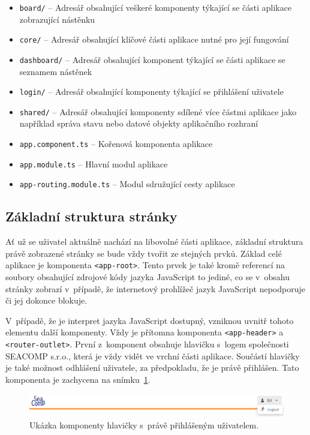 \begin{itemize}
  \item \texttt{board/} -- Adresář obsahující veškeré komponenty týkající se části aplikace zobrazující nástěnku
  \item \texttt{core/} -- Adresář obsahující klíčové části aplikace nutné pro její fungování
  \item \texttt{dashboard/} -- Adresář obsahující komponent týkající se části aplikace se seznamem nástěnek
  \item \texttt{login/} -- Adresář obsahující komponenty týkající se přihlášení uživatele
  \item \texttt{shared/} -- Adresář obsahující komponenty sdílené více částmi aplikace jako například správa stavu nebo datové objekty aplikačního rozhraní
  \item \texttt{app.component.ts} -- Kořenová komponenta aplikace
  \item \texttt{app.module.ts} -- Hlavní modul aplikace
  \item \texttt{app-routing.module.ts} -- Modul sdružující cesty aplikace
\end{itemize}


\subsection{Základní struktura stránky}
Ať už se uživatel aktuálně nachází na libovolné části aplikace, základní struktura právě zobrazené stránky se bude vždy tvořit ze stejných prvků. Základ celé aplikace je komponenta \texttt{<app-root>}. Tento prvek je také kromě referencí na soubory obsahující zdrojové kódy jazyka JavaScript to jediné, co se v~obsahu stránky zobrazí v~případě, že internetový prohlížeč jazyk JavaScript nepodporuje či jej dokonce blokuje. 

V~případě, že je interpret jazyka JavaScript dostupný, vzniknou uvnitř tohoto elementu další komponenty. Vždy je přítomna komponenta \texttt{<app-header>} a \texttt{<router-outlet>}. První z~komponent obsahuje hlavičku s~logem společnosti SEACOMP s.r.o., která je vždy vidět ve vrchní části aplikace. Součástí hlavičky je také možnost odhlášení uživatele, za předpokladu, že je právě přihlášen. Tato komponenta je zachycena na snímku~\ref{img:comp-header}.


\begin{figure}[H]
	\centering
	\label{img:comp-header}
	\includegraphics[width=\textwidth]{obrazky-figures/comp-header.png}
	\caption{Ukázka komponenty hlavičky s~právě přihlášeným uživatelem.}
\end{figure}

